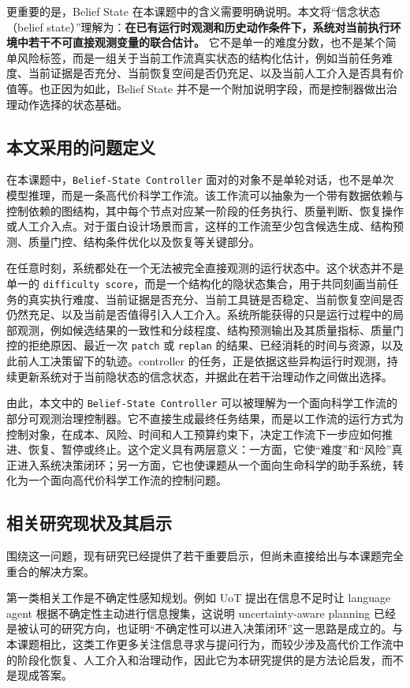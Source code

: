更重要的是，Belief State 在本课题中的含义需要明确说明。本文将“信念状态（belief state）”理解为：\textbf{在已有运行时观测和历史动作条件下，系统对当前执行环境中若干不可直接观测变量的联合估计。} 它不是单一的难度分数，也不是某个简单风险标签，而是一组关于当前工作流真实状态的结构化估计，例如当前任务难度、当前证据是否充分、当前恢复空间是否仍充足、以及当前人工介入是否具有价值等。也正因为如此，Belief State 并不是一个附加说明字段，而是控制器做出治理动作选择的状态基础。

\subsection{本文采用的问题定义}

在本课题中，\texttt{Belief-State Controller} 面对的对象不是单轮对话，也不是单次模型推理，而是一条高代价科学工作流。该工作流可以抽象为一个带有数据依赖与控制依赖的图结构，其中每个节点对应某一阶段的任务执行、质量判断、恢复操作或人工介入点。对于蛋白设计场景而言，这样的工作流至少包含候选生成、结构预测、质量门控、结构条件优化以及恢复等关键部分。

在任意时刻，系统都处在一个无法被完全直接观测的运行状态中。这个状态并不是单一的 \texttt{difficulty score}，而是一个结构化的隐状态集合，用于共同刻画当前任务的真实执行难度、当前证据是否充分、当前工具链是否稳定、当前恢复空间是否仍然充足、以及当前是否值得引入人工介入。系统所能获得的只是运行过程中的局部观测，例如候选结果的一致性和分歧程度、结构预测输出及其质量指标、质量门控的拒绝原因、最近一次 \texttt{patch} 或 \texttt{replan} 的结果、已经消耗的时间与资源，以及此前人工决策留下的轨迹。controller 的任务，正是依据这些异构运行时观测，持续更新系统对于当前隐状态的信念状态，并据此在若干治理动作之间做出选择。

由此，本文中的 \texttt{Belief-State Controller} 可以被理解为一个面向科学工作流的部分可观测治理控制器。它不直接生成最终任务结果，而是以工作流的运行方式为控制对象，在成本、风险、时间和人工预算约束下，决定工作流下一步应如何推进、恢复、暂停或终止。这个定义具有两层意义：一方面，它使“难度”和“风险”真正进入系统决策闭环；另一方面，它也使课题从一个面向生命科学的助手系统，转化为一个面向高代价科学工作流的控制问题。

\subsection{相关研究现状及其启示}

围绕这一问题，现有研究已经提供了若干重要启示，但尚未直接给出与本课题完全重合的解决方案。

第一类相关工作是不确定性感知规划。例如 UoT\parencite{uot} 提出在信息不足时让 language agent 根据不确定性主动进行信息搜集，这说明 uncertainty-aware planning 已经是被认可的研究方向，也证明“不确定性可以进入决策闭环”这一思路是成立的。与本课题相比，这类工作更多关注信息寻求与提问行为，而较少涉及高代价工作流中的阶段化恢复、人工介入和治理动作，因此它为本研究提供的是方法论启发，而不是现成答案。

